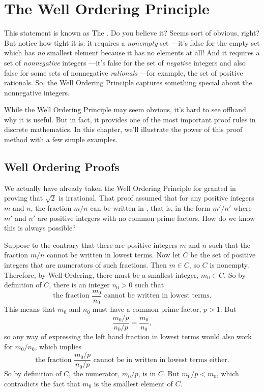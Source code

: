\chapter{The Well Ordering Principle}\label{well_ordering_chap}


This statement is known as The .  Do you
believe it?  Seems sort of obvious, right?  But notice how tight it is: it
requires a \emph{nonempty} set ---it's false for the empty set which has
\emph{no} smallest element because it has no elements at all!  And it
requires a set of \emph{nonnegative} integers ---it's false for the set of
\emph{negative} integers and also false for some sets of nonnegative
\emph{rationals} ---for example, the set of positive rationals.  So, the
Well Ordering Principle captures something special about the nonnegative
integers.

While the Well Ordering Principle may seem obvious, \iffalse it looks
nothing like the induction axiom, and\fi it's hard to see offhand why
it is useful.  But in fact, it provides one of the most important
proof rules in discrete mathematics.  In this chapter, we'll
illustrate the power of this proof method with a few simple examples.

\iffalse We'll explain this after we introduce a
template for well ordering principle proofs resembling the template in
Section~\ref{templ-induct-proofs} for a proof by strong induction.\fi


\section{Well Ordering Proofs}
We actually have already taken the Well Ordering Principle for granted
in proving that $\sqrt{2}$ is irrational.  That proof assumed that for
any positive integers $m$ and $n$, the fraction $m/n$ can be written
in , that is, in the form $m'/n'$ where $m'$ and
$n'$ are positive integers with no common prime factors.  How do we
know this is always possible?

Suppose to the contrary that there are positive integers $m$ and $n$
such that the fraction $m/n$ cannot be written in lowest terms.  Now
let $C$ be the set of positive integers that are numerators of such
fractions.  Then $m \in C$, so $C$ is nonempty.  Therefore, by Well
Ordering, there must be a smallest integer, $m_0 \in C$.  So by
definition of $C$, there is an integer $n_0 > 0$ such that
\[
\text{the fraction } \frac{m_0}{n_0} \text{ cannot be written in lowest
terms.}
\]
This means that $m_0$ and $n_0$ must have a common prime factor,
$p>1$.  But
\[
\frac{m_0/p}{n_0/p} = \frac{m_0}{n_0},
\]
so any way of expressing the left hand fraction in lowest terms would also
work for $m_0/n_0$, which implies
\[
\text{the fraction } \frac{m_0/p}{n_0/p} \text{ cannot be in written in
lowest terms either.}
\]
So by definition of $C$, the numerator, $m_0/p$, is in $C$.  But $m_0/p <
m_0$, which contradicts the fact that $m_0$ is the smallest element of $C$.

